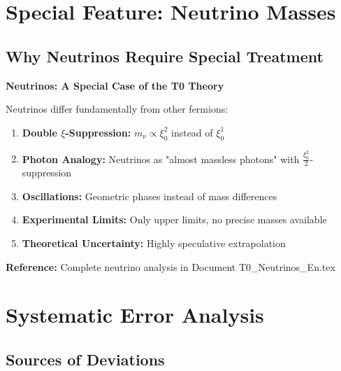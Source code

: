 \documentclass[12pt,a4paper]{article}
\begin{document}
	\section{Special Feature: Neutrino Masses}
	
	\subsection{Why Neutrinos Require Special Treatment}
	
	\begin{warning}
		\textbf{Neutrinos: A Special Case of the T0 Theory}
		
		Neutrinos differ fundamentally from other fermions:
		
		\begin{enumerate}
			\item \textbf{Double $\xi$-Suppression:} $m_\nu \propto \xi_0^2$ instead of $\xi_0^1$
			
			\item \textbf{Photon Analogy:} Neutrinos as "almost massless photons" with $\frac{\xi_0^2}{2}$-suppression
			
			\item \textbf{Oscillations:} Geometric phases instead of mass differences
			
			\item \textbf{Experimental Limits:} Only upper limits, no precise masses available
			
			\item \textbf{Theoretical Uncertainty:} Highly speculative extrapolation
		\end{enumerate}
		
		\textbf{Reference:} Complete neutrino analysis in Document T0\_Neutrinos\_En.tex
	\end{warning}
	
	\section{Systematic Error Analysis}
	
	\subsection{Sources of Deviations}
	
\end{document}

